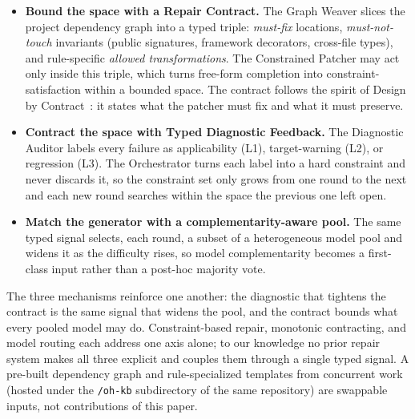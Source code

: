 \documentclass[10pt,conference]{IEEEtran}
\makeatletter
\def\cite{\just@cite} %
\makeatother
\begin{document}
\begin{itemize}

    
\item \textbf{Bound the space with a Repair Contract.} The Graph Weaver slices the project dependency graph into a typed triple: \emph{must-fix} locations, \emph{must-not-touch} invariants (public signatures, framework decorators, cross-file types), and rule-specific \emph{allowed transformations}. The Constrained Patcher may act only inside this triple, which turns free-form completion into constraint-satisfaction within a bounded space. The contract follows the spirit of Design by Contract~\cite{meyer1992dbc}: it states what the patcher must fix and what it must preserve.

\item \textbf{Contract the space with Typed Diagnostic Feedback.} The Diagnostic Auditor labels every failure as applicability (L1), target-warning (L2), or regression (L3). The Orchestrator turns each label into a hard constraint and never discards it, so the constraint set only grows from one round to the next and each new round searches within the space the previous one left open.

\item \textbf{Match the generator with a complementarity-aware pool.} The same typed signal selects, each round, a subset of a heterogeneous model pool and widens it as the difficulty rises, so model complementarity becomes a first-class input rather than a post-hoc majority vote.
\end{itemize}
The three mechanisms reinforce one another: the diagnostic that tightens the contract is the same signal that widens the pool, and the contract bounds what every pooled model may do. Constraint-based repair, monotonic contracting, and model routing each address one axis alone; to our knowledge no prior repair system makes all three explicit and couples them through a single typed signal. A pre-built dependency graph and rule-specialized templates from concurrent work (hosted under the \texttt{/oh-kb} subdirectory of the same repository) are swappable inputs, not contributions of this paper.
\end{document}
